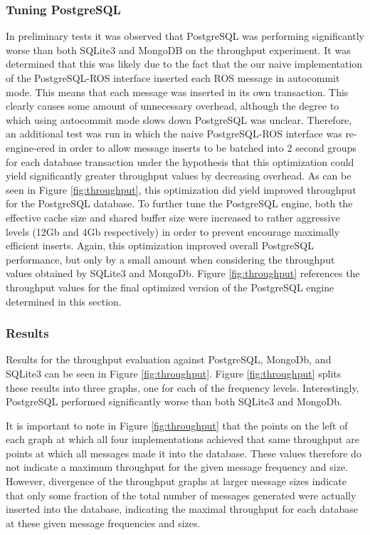 \documentclass[nocopyrightspace]{acm_proc_article-sp}
\begin{document}
\subsubsection{Tuning PostgreSQL}
In preliminary tests it was observed that PostgreSQL was performing significantly worse than both SQLite3 and MongoDB on the throughput experiment. It was determined that this was likely due to the fact that the our naive implementation of the PostgreSQL-ROS interface inserted each ROS message in autocommit mode. This means that each message was inserted in its own transaction. This clearly causes some amount of unnecessary overhead, although the degree to which using autocommit mode slows down PostgreSQL was unclear. Therefore, an additional test was run in which the naive PostgreSQL-ROS interface was re-engine-ered in order to allow message inserts to be batched into 2 second groups for each database transaction under the hypothesis that this optimization could yield significantly greater throughput values by decreasing overhead. As can be seen in Figure \ref{fig:throughput}, this optimization did yield improved throughput for the PostgreSQL database. To further tune the PostgreSQL engine, both the effective cache size and shared buffer size were increased to rather aggressive levels (12Gb and 4Gb respectively) in order to prevent encourage maximally efficient inserts. Again, this optimization improved overall PostgreSQL performance, but only by a small amount when considering the throughput values obtained by SQLite3 and MongoDb. Figure \ref{fig:throughput} references the throughput values for the final optimized version of the PostgreSQL engine determined in this section.


\subsubsection{Results}
Results for the throughput evaluation against PostgreSQL, MongoDb, and SQLite3 can be seen in Figure \ref{fig:throughput}. Figure \ref{fig:throughput} splits these results into three graphs, one for each of the frequency levels. Interestingly, PostgreSQL performed significantly worse than both SQLite3 and MongoDb. 

It is important to note in Figure \ref{fig:throughput} that the points on the left of each graph at which all four implementations achieved that same throughput are points at which all messages made it into the database. These values therefore do not indicate a maximum throughput for the given message frequency and size. However, divergence of the throughput graphs at larger message sizes indicate that only some fraction of the total number of messages generated were actually inserted into the database, indicating the maximal throughput for each database at these given message frequencies and sizes. 
\end{document}
